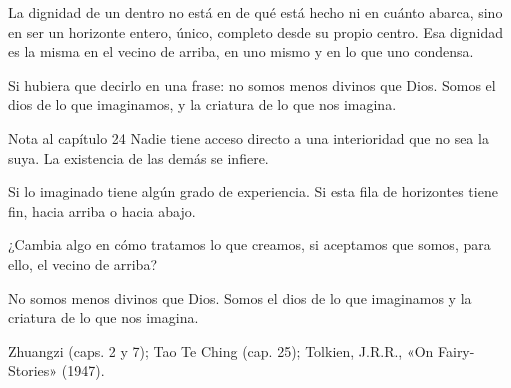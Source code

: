 La dignidad de un dentro no está en de qué está hecho ni en cuánto abarca, sino en ser un horizonte entero, único, completo desde su propio centro. Esa dignidad es la misma en el vecino de arriba, en uno mismo y en lo que uno condensa.

Si hubiera que decirlo en una frase: no somos menos divinos que Dios. Somos el dios de lo que imaginamos, y la criatura de lo que nos imagina.

\begin{notacap}{Nota al capítulo 24}
 Nadie tiene acceso directo a una interioridad que no sea la suya. La existencia de las demás se infiere.

 Si lo imaginado tiene algún grado de experiencia. Si esta fila de horizontes tiene fin, hacia arriba o hacia abajo.

 ¿Cambia algo en cómo tratamos lo que creamos, si aceptamos que somos, para ello, el vecino de arriba?

 No somos menos divinos que Dios. Somos el dios de lo que imaginamos y la criatura de lo que nos imagina.

 Zhuangzi (caps. 2 y 7); Tao Te Ching (cap. 25); Tolkien, J.R.R., «On Fairy-Stories» (1947).
\end{notacap}
